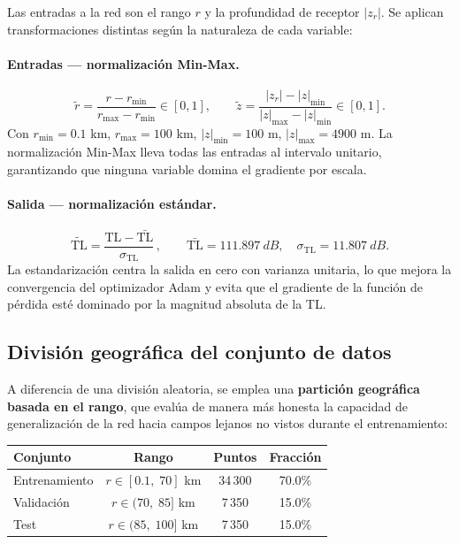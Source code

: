 \documentclass[12pt,a4paper]{article}
\newcommand{\TL}{\mathrm{TL}}
\newcommand{\rnorm}{\tilde{r}}
\newcommand{\znorm}{\tilde{z}}
\newcommand{\TLnorm}{\widetilde{\TL}}
\begin{document}
Las entradas a la red son el rango $r$ y la profundidad de receptor $|z_r|$.
Se aplican transformaciones distintas según la naturaleza de cada variable:

\paragraph{Entradas — normalización Min-Max.}
\begin{equation}
  \rnorm = \frac{r - r_{\min}}{r_{\max} - r_{\min}} \in [0,1],
  \qquad
  \znorm = \frac{|z_r| - |z|_{\min}}{|z|_{\max} - |z|_{\min}} \in [0,1].
  \label{eq:normXY}
\end{equation}
Con $r_{\min}=0.1$ km, $r_{\max}=100$ km, $|z|_{\min}=100$ m,
$|z|_{\max}=4900$ m.
La normalización Min-Max lleva todas las entradas al intervalo unitario,
garantizando que ninguna variable domina el gradiente por escala.

\paragraph{Salida — normalización estándar.}
\begin{equation}
  \TLnorm = \frac{\TL - \bar{\TL}}{\sigma_{\TL}}\,,
  \qquad
  \bar{\TL} = \SI{111.897}{dB},\quad \sigma_{\TL} = \SI{11.807}{dB}.
  \label{eq:normTL}
\end{equation}
La estandarización centra la salida en cero con varianza unitaria, lo que
mejora la convergencia del optimizador Adam y evita que el gradiente de la
función de pérdida esté dominado por la magnitud absoluta de la TL.

\subsection{División geográfica del conjunto de datos}

A diferencia de una división aleatoria, se emplea una \textbf{partición
geográfica basada en el rango}, que evalúa de manera más honesta la capacidad
de generalización de la red hacia campos lejanos no vistos durante el
entrenamiento:

\begin{center}
\begin{tabular}{lccc}
\toprule
Conjunto & Rango & Puntos & Fracción \\
\midrule
Entrenamiento & $r \in [0.1,\;70]$ km    & 34\,300 & 70.0\% \\
Validación    & $r \in (70,\;85]$ km     &  7\,350 & 15.0\% \\
Test          & $r \in (85,\;100]$ km    &  7\,350 & 15.0\% \\
\bottomrule
\end{tabular}
\end{center}
\end{document}
